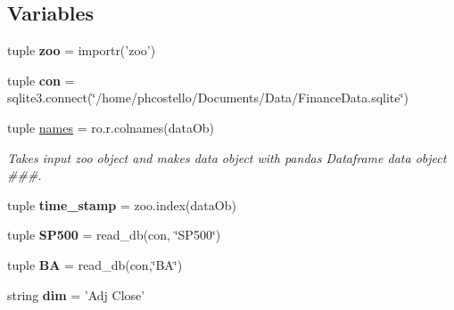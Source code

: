 \subsection*{\-Variables}
\begin{DoxyCompactItemize}
\item 
\hypertarget{namespacestrategy__tester_1_1market__data_ae337cf8fab73a0b7c41ca951af2a169e}{tuple {\bfseries zoo} = importr('zoo')}\label{namespacestrategy__tester_1_1market__data_ae337cf8fab73a0b7c41ca951af2a169e}

\item 
\hypertarget{namespacestrategy__tester_1_1market__data_aff1c75c2d08118b86572f41125b2527c}{tuple {\bfseries con} = sqlite3.\-connect(\char`\"{}/home/phcostello/\-Documents/\-Data/\-Finance\-Data.\-sqlite\char`\"{})}\label{namespacestrategy__tester_1_1market__data_aff1c75c2d08118b86572f41125b2527c}

\item 
\hypertarget{namespacestrategy__tester_1_1market__data_a98f0eca26cf477610399e6b158a136ad}{tuple \hyperlink{namespacestrategy__tester_1_1market__data_a98f0eca26cf477610399e6b158a136ad}{names} = ro.\-r.\-colnames(data\-Ob)}\label{namespacestrategy__tester_1_1market__data_a98f0eca26cf477610399e6b158a136ad}

\begin{DoxyCompactList}\small\item\em \-Takes input zoo object and makes data object with pandas \-Dataframe data object \#\#\#. \end{DoxyCompactList}\item 
\hypertarget{namespacestrategy__tester_1_1market__data_ad9a43e2bc6352bd3bce3105bf917a9b6}{tuple {\bfseries time\-\_\-stamp} = zoo.\-index(data\-Ob)}\label{namespacestrategy__tester_1_1market__data_ad9a43e2bc6352bd3bce3105bf917a9b6}

\item 
\hypertarget{namespacestrategy__tester_1_1market__data_a1c7ebb9344f7a7062aa89eecddc759df}{tuple {\bfseries \-S\-P500} = read\-\_\-db(con, \char`\"{}\-S\-P500\char`\"{})}\label{namespacestrategy__tester_1_1market__data_a1c7ebb9344f7a7062aa89eecddc759df}

\item 
\hypertarget{namespacestrategy__tester_1_1market__data_a62b9420cdf50f98a7d41a71fc1ca6af9}{tuple {\bfseries \-B\-A} = read\-\_\-db(con,\char`\"{}\-B\-A\char`\"{})}\label{namespacestrategy__tester_1_1market__data_a62b9420cdf50f98a7d41a71fc1ca6af9}

\item 
\hypertarget{namespacestrategy__tester_1_1market__data_a04db9fb5886fb39b8e9a5dc15c57c6ca}{string {\bfseries dim} = '\-Adj \-Close'}\label{namespacestrategy__tester_1_1market__data_a04db9fb5886fb39b8e9a5dc15c57c6ca}


\end{DoxyCompactItemize}
